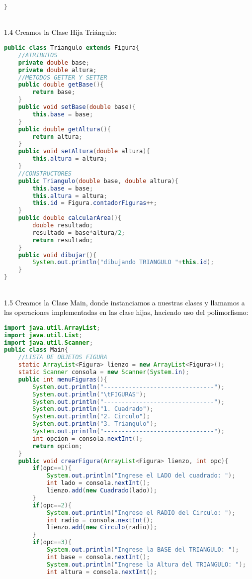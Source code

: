 \documentclass{article}
\begin{document}
\begin{itemize}
\begin{itemize}
\begin{lstlisting}[language=java]
}

        \end{lstlisting}
        \newline
        \\
        \textcolor{black}{1.4 Creamos la Clase Hija Triángulo:} 
		\begin{lstlisting}[language=java]
public class Triangulo extends Figura{
    //ATRIBUTOS
    private double base;
    private double altura;
    //METODOS GETTER Y SETTER
    public double getBase(){
        return base;
    }
    public void setBase(double base){
        this.base = base;
    }
    public double getAltura(){
        return altura;
    }
    public void setAltura(double altura){
        this.altura = altura;
    }
    //CONSTRUCTORES
    public Triangulo(double base, double altura){
        this.base = base;
        this.altura = altura;
        this.id = Figura.contadorFiguras++;
    }
    public double calcularArea(){
        double resultado;
        resultado = base*altura/2;
        return resultado;
    }
    public void dibujar(){
        System.out.println("dibujando TRIANGULO "+this.id);
    }
}

        \end{lstlisting}
                \newline
        \\
        \textcolor{black}{1.5 Creamos la Clase Main, donde instanciamos a nuestras clases y llamamos a las operaciones implementadas en las clase hijas, haciendo uso del polimorfismo:} 
		\begin{lstlisting}[language=java]
import java.util.ArrayList;
import java.util.List;
import java.util.Scanner;
public class Main{
    //LISTA DE OBJETOS FIGURA
    static ArrayList<Figura> lienzo = new ArrayList<Figura>();
    static Scanner consola = new Scanner(System.in);
    public int menuFiguras(){
        System.out.println("-------------------------------");
        System.out.println("\tFIGURAS");
        System.out.println("-------------------------------");
        System.out.println("1. Cuadrado");
        System.out.println("2. Circulo");
        System.out.println("3. Triangulo");
        System.out.println("-------------------------------");
        int opcion = consola.nextInt();
        return opcion;
    }
    public void crearFigura(ArrayList<Figura> lienzo, int opc){
        if(opc==1){
            System.out.println("Ingrese el LADO del cuadrado: ");
            int lado = consola.nextInt();
            lienzo.add(new Cuadrado(lado));
        }
        if(opc==2){
            System.out.println("Ingrese el RADIO del Circulo: ");
            int radio = consola.nextInt();
            lienzo.add(new Circulo(radio));
        }
        if(opc==3){
            System.out.println("Ingrese la BASE del TRIANGULO: ");
            int base = consola.nextInt();
            System.out.println("Ingrese la Altura del TRIANGULO: ");
            int altura = consola.nextInt();


\end{lstlisting}
\end{itemize}
\end{itemize}
\end{document}
